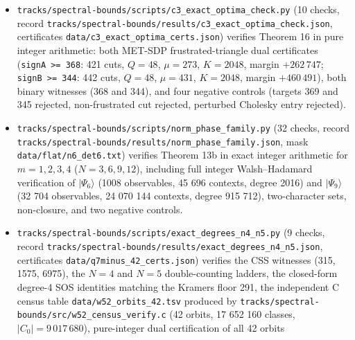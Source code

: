 \documentclass[11pt,a4paper]{article}
\begin{document}
\begin{itemize}
  Proposition 16\textquotesingle{} in exact integer and SymPy arithmetic: uniform top-eigenspace diagonal \(P_{ii}=1/8\) for
  \(\sigma_0\), four-orbit geometric shift \(d_{16}(p\bmod4)\in\{-40,+8,+8,+24\}\) for \(\sigma_1\), exact
  SymPy characteristic-polynomial identity \(\chi_{M_{64}}(t)=\prod_{k=0}^3\chi_{B_k}(t)^2\), all four
  fraction-free integer \(LDL^{\mathsf T}\) factorizations and positive Sylvester minors, both binary
  witnesses (368 and 344), and three negative controls (including failure of positive definiteness at
  threshold \(230/16\)).
\item
  \nolinkurl{tracks/spectral-bounds/scripts/c3_exact_optima_check.py} (10 checks, record \nolinkurl{tracks/spectral-bounds/results/c3_exact_optima_check.json}, certificates
  \nolinkurl{data/c3_exact_optima_certs.json}) verifies Theorem 16\textquotesingle\textquotesingle{} in pure integer arithmetic: both MET-SDP
  frustrated-triangle dual certificates (\texttt{signA\ \textgreater{}=\ 368}: 421 cuts, \(Q=48\), \(\mu=273\), \(K=2048\), margin
  \(+262\,747\); \texttt{signB\ \textgreater{}=\ 344}: 442 cuts, \(Q=48\), \(\mu=431\), \(K=2048\), margin \(+460\,491\)), both binary
  witnesses (368 and 344), and four negative controls (targets 369 and 345 rejected, non-frustrated cut
  rejected, perturbed Cholesky entry rejected).
\item
  \nolinkurl{tracks/spectral-bounds/scripts/norm_phase_family.py} (32 checks, record \nolinkurl{tracks/spectral-bounds/results/norm_phase_family.json}, mask
  \nolinkurl{data/flat/n6_det6.txt}) verifies Theorem 13b in exact integer arithmetic for \(m = 1, 2, 3, 4\)
  (\(N = 3, 6, 9, 12\)), including full integer Walsh--Hadamard verification of \(|\Psi_6\rangle\) (1008
  observables, 45 696 contexts, degree 2016) and \(|\Psi_9\rangle\) (32 704 observables, 24 070 144
  contexts, degree 915 712), two-character sets, non-closure, and two negative controls.
\item
  \nolinkurl{tracks/spectral-bounds/scripts/exact_degrees_n4_n5.py} (9 checks, record \nolinkurl{tracks/spectral-bounds/results/exact_degrees_n4_n5.json}, certificates
  \nolinkurl{data/q7minus_42_certs.json}) verifies the CSS witnesses (315, 1575, 6975), the \(N=4\) and \(N=5\)
  double-counting ladders, the closed-form degree-4 SOS identities matching the Kramers floor 291, the
  independent C census table \nolinkurl{data/w52_orbits_42.tsv} produced by \nolinkurl{tracks/spectral-bounds/src/w52_census_verify.c} (42 orbits,
  17 652 160 classes, \(|C_0|=9\,017\,680\)), pure-integer dual certification of all 42 orbits

\end{itemize}
\end{document}
